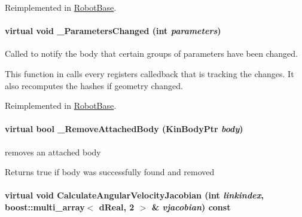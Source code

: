 Reimplemented in \hyperlink{classOpenRAVE_1_1RobotBase_a3a10edb8cb573ac97bfed0e05dc2a29a}{RobotBase}.

\hypertarget{classOpenRAVE_1_1KinBody_a218a09068212db7bb35c7d4ce792e309}{
\paragraph[{\_\-ParametersChanged}]{\setlength{\rightskip}{0pt plus 5cm}virtual void \_\-ParametersChanged (int {\em parameters})}\hfill}
\label{classOpenRAVE_1_1KinBody_a218a09068212db7bb35c7d4ce792e309}


Called to notify the body that certain groups of parameters have been changed. 

This function in calls every registers calledback that is tracking the changes. It also recomputes the hashes if geometry changed. 

Reimplemented in \hyperlink{classOpenRAVE_1_1RobotBase_a218a09068212db7bb35c7d4ce792e309}{RobotBase}.

\hypertarget{classOpenRAVE_1_1KinBody_a718b569da1eb4373e83434f09b839705}{
\paragraph[{\_\-RemoveAttachedBody}]{\setlength{\rightskip}{0pt plus 5cm}virtual bool \_\-RemoveAttachedBody (KinBodyPtr {\em body})}\hfill}
\label{classOpenRAVE_1_1KinBody_a718b569da1eb4373e83434f09b839705}


removes an attached body 

\begin{DoxyReturn}{Returns}
true if body was successfully found and removed 
\end{DoxyReturn}
\hypertarget{classOpenRAVE_1_1KinBody_a48eef419ccc30bfcdd82febedd6f54b7}{
\paragraph[{CalculateAngularVelocityJacobian}]{\setlength{\rightskip}{0pt plus 5cm}virtual void CalculateAngularVelocityJacobian (int {\em linkindex}, \/  boost::multi\_\-array$<$ dReal, 2 $>$ \& {\em vjacobian}) const}\hfill}
\label{classOpenRAVE_1_1KinBody_a48eef419ccc30bfcdd82febedd6f54b7}


